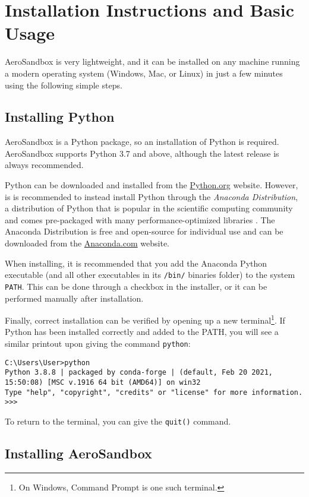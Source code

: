 \chapter{Installation Instructions and Basic Usage}
\label{chapter:installation}

AeroSandbox is very lightweight, and it can be installed on any machine running a modern operating system (Windows, Mac, or Linux) in just a few minutes using the following simple steps.


\section{Installing Python}

AeroSandbox is a Python package, so an installation of Python is required. AeroSandbox supports Python 3.7 and above, although the latest release is always recommended.

Python can be downloaded and installed from the \url{Python.org} website. However, is is recommended to instead install Python through the \textit{Anaconda Distribution}, a distribution of Python that is popular in the scientific computing community and comes pre-packaged with many performance-optimized libraries \cite{anaconda}. The Anaconda Distribution is free and open-source for individual use and can be downloaded from the \url{Anaconda.com} website.

When installing, it is recommended that you add the Anaconda Python executable (and all other executables in its \texttt{/bin/} binaries folder) to the system \texttt{PATH}. This can be done through a checkbox in the installer, or it can be performed manually after installation.

Finally, correct installation can be verified by opening up a new terminal\footnote{On Windows, Command Prompt is one such terminal.}. If Python has been installed correctly and added to the PATH, you will see a similar printout upon giving the command \texttt{python}:

\begin{verbatim}
C:\Users\User>python
Python 3.8.8 | packaged by conda-forge | (default, Feb 20 2021, 15:50:08) [MSC v.1916 64 bit (AMD64)] on win32
Type "help", "copyright", "credits" or "license" for more information.
>>>
\end{verbatim}

To return to the terminal, you can give the \texttt{quit()} command.


\section{Installing AeroSandbox}

